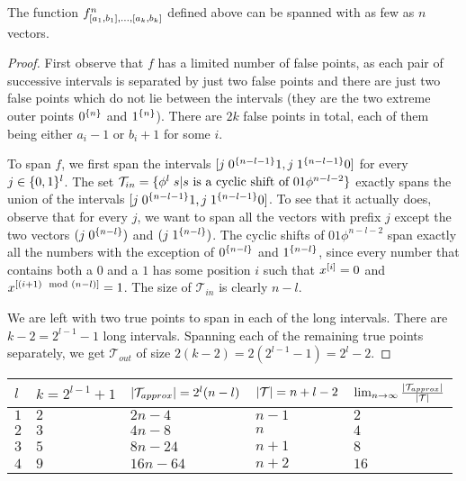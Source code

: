 \begin{lemma}
The function
$f^n_{[a_1, b_1], \ldots, [a_k, b_k]}$
defined above can be spanned with as few as $n$ vectors.
\end{lemma}

\begin{proof}
First observe that $f$
has a limited number of false points,
as each pair of successive intervals
is separated by just two false points
and there are just two false points
which do not lie between the intervals
(they are the two extreme outer points
$0^{\{n\}}$ and $1^{\{n\}}$).
There are $2k$ false points in total,
each of them being either $a_i - 1$ or $b_i + 1$
for some $i$.

To span $f$,
we first span the intervals
$[j \; 0^{\{n-l-1\}} 1, j \; 1^{\{n-l-1\}} 0]$
for every $j \in \{0, 1\}^l$.
The set
$\mathcal{T}_{in} =
\{\phi^l \; s |
s \text{ is a cyclic shift of } 01 \phi^{n-l-2}\}$
exactly spans the union of the intervals
$[j \; 0^{\{n-l-1\}} 1, j \; 1^{\{n-l-1\}} 0]$.
To see that it actually does,
observe that for every $j$,
we want to span all the vectors with prefix $j$
except the two vectors $(j \; 0^{\{n-l\}})$
and $(j \; 1^{\{n-l\}})$.
The cyclic shifts of $01 \phi^{n-l-2}$ span exactly
all the numbers with the exception of
$0^{\{n-l\}}$ and $1^{\{n-l\}}$,
since every number that contains both a $0$ and a $1$
has some position $i$ such that
$x^{[i]} = 0$
and $x^{[(i+1) \mod (n-l)]} = 1$.
The size of $\mathcal{T}_{in}$ is clearly $n-l$.

We are left with two true points to span
in each of the long intervals.
There are $k-2 = 2^{l-1} - 1$ long intervals.
Spanning each of the remaining true points separately,
we get $\mathcal{T}_{out}$ of size
$2(k-2) = 2(2^{l-1}-1) = 2^l - 2$.

\end{proof}

\begin{center}
\begin{tabular}{l|llll}
$l$
& $k = 2^{l-1} + 1$
& $\lvert\mathcal{T}_{approx}\rvert = 2^l (n-l)$
& $\lvert\mathcal{T}\rvert = n + l - 2$
& $\lim_{n \rightarrow \infty}
{\frac{\lvert\mathcal{T}_{approx}\rvert}{\lvert\mathcal{T}\rvert}}$
\\
\hline
$1$ & $2$ & $2n-4$ & $n-1$ & $2$ \\
$2$ & $3$ & $4n-8$ & $n$ & $4$ \\
$3$ & $5$ & $8n-24$ & $n+1$ & $8$ \\
$4$ & $9$ & $16n-64$ & $n+2$ & $16$
\end{tabular}
\end{center}

